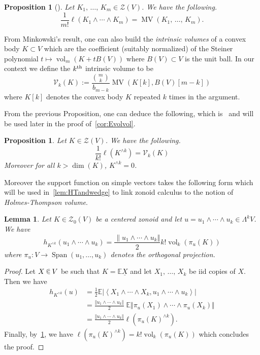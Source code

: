 \documentclass[10pt]{amsart}
\newtheorem{lemm}[theo]{Lemma}\newtheorem{prop}[theo]{Proposition}\newtheorem{coro}[theo]{Corollary}\newtheorem{conj}[theo]{Conjecture}
\theoremstyle{definition}\newtheorem{defi}[theo]{Definition}\newtheorem{rema}[theo]{Remark}\newtheorem{exam}[theo]{Example}\newtheorem{exem}[theo]{Example}\newtheorem{nota}[theo]{Notation}
\newcommand{\EE}{\mathbb{E}}
\newcommand{\ZZ}{\mathscr{Z}}
\newcommand{\ZZo}{\mathscr{Z}_0}
\DeclareMathOperator{\vol}{vol}
\DeclareMathOperator{\Span}{Span}
\DeclareMathOperator{\MV}{MV}
\newcommand{\Vint}{\mathcal{V}}
\newcommand{\seg}{\underline}
\newcommand{\uball}{b}
\newcommand*\randin{
\mathchoice {\raisebox{-.35ex}{$\displaystyle{^\subset}$}\mkern-11.5mu\raisebox{+.45ex}{$\displaystyle{_\subset}$}} {\mkern+1mu\raisebox{-.27ex}{$\textstyle{^\subset}$}\mkern-11.7mu\raisebox{+.45ex}{$\textstyle{_\subset}$}} {\raisebox{.35ex}{$\scriptstyle\subset$}\mkern-14mu\raisebox{-.15ex}{$\scriptstyle\subset$}} {\raisebox{.3ex}{$\scriptscriptstyle\subset$}\mkern-13.5mu\raisebox{-.10ex}{$\scriptscriptstyle\subset$}}}
\begin{document}
\begin{prop}[{\cite[Theorem~5.1]{ZA}}]\label{prop:MVandwedge}
Let $K_1,\,\ldots,\,K_m\in\ZZ(V)$. We have the following.
\begin{equation*}
\frac{1}{m!}\ell(K_1\wedge\cdots\wedge K_m)=\MV(K_1,\,\ldots,\,K_m).
\end{equation*}
\end{prop}

From Minkowski's result, one can also build the \emph{intrinsic volumes} of a convex body $K\subset V$ which are the coefficient (suitably normalized) of the Steiner polynomial $t\mapsto \vol_m(K+tB(V))$ where $B(V)\subset V$ is the unit ball. In our context we define the $k^{\rm th}$ intrinsic volume to be
\begin{equation}\label{eq:defvint}
\Vint_k(K):=\frac{\binom{m}{k}}{\uball_{m-k}}\MV(K[k],B(V)[m-k])
\end{equation}
where $K[k]$ denotes the convex body $K$ repeated $k$ times in the argument.

From the previous Proposition, one can deduce the following, which is~\cite[Theorem~5.2]{ZA} and will be used later in the proof of~\cref{cor:Evolvol}.

\begin{prop}\label{prop:kintvolpow}
Let $K\in\ZZ(V)$. We have the following.
\begin{equation*}
\frac{1}{k!}\ell\left(K^{\wedge k}\right)=\Vint_k(K)
\end{equation*}
Moreover for all $k>\dim(K)$, $K^{\wedge k} =0$.
\end{prop}

Moreover the support function on simple vectors takes the following form which will be used in~\cref{lem:HTandwedge} to link zonoid calculus to the notion of \emph{Holmes-Thompson volume}.

\begin{lemm}\label{lem:supofsimplek}
Let $K\in\ZZo(V)$ be a centered zonoid and let $u=u_1\wedge\cdots \wedge u_k\in\Lambda^k V$. We have
\begin{equation*}
h_{K^{\wedge k}}(u_1\wedge\cdots\wedge u_k)=\frac{\|u_1\wedge\cdots\wedge u_k\Vert}{2}k!\vol_k(\pi_u(K))
\end{equation*}
where $\pi_u:V\to \Span(u_1,\ldots,u_k)$ denotes the orthogonal projection.
\end{lemm}

\begin{proof}
Let $X\,\randin\, V$ be such that $K=\EE\seg{X}$ and let $X_1,\,\ldots,\,X_k$ be iid copies of $X$. Then we have
\begin{align*}
h_{K^{\wedge k}}(u)&=\frac{1}{2}\EE\left|\left\langle X_1\wedge \cdots \wedge X_k, u_1\wedge \cdots\wedge u_k\right\rangle\right| \\
&=\frac{\Vert u_1\wedge \cdots \wedge u_k\Vert}{2}\;\EE\Vert \pi_u(X_1)\wedge \cdots \wedge \pi_u(X_k)\Vert \\
&=\frac{\Vert u_1\wedge \cdots \wedge u_k\Vert}{2}\ell\left(\pi_u(K)^{\wedge k}\right).
\end{align*}
Finally, by~\cref{prop:MVandwedge}, we have $\ell(\pi_u(K)^{\wedge k})=k!\vol_k(\pi_u(K))$ which concludes the proof.
\end{proof}
\end{document}
